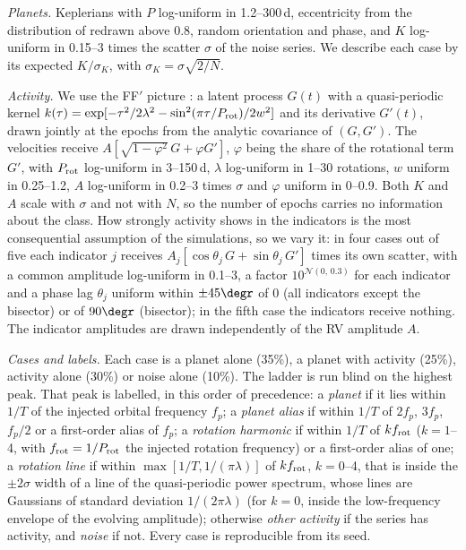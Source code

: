 \emph{Planets.} Keplerians with $P$ log-uniform in 1.2--300\,d, eccentricity from
the distribution of \citet{Kipping2013} redrawn above 0.8, random orientation and
phase, and $K$ log-uniform in 0.15--3 times the scatter $\sigma$ of the noise series.
We describe each case by its expected $K/\sigma_K$, with
$\sigma_K = \sigma\sqrt{2/N}$.

\emph{Activity.} We use the FF$'$ picture \citep{Aigrain2012,Rajpaul2015}: a latent
process $G(t)$ with a quasi-periodic kernel
$k(\tau) = \exp[-\tau^2/2\lambda^2 - \sin^2(\pi\tau/P_{\rm rot})/2w^2]$ and its
derivative $G'(t)$, drawn jointly at the epochs from the analytic covariance of
$(G, G')$. The velocities receive $A[\sqrt{1-\varphi^2}\,G + \varphi G']$, $\varphi$ being
the share of the rotational term $G'$, with
$P_{\rm rot}$ log-uniform in 3--150\,d, $\lambda$ log-uniform in 1--30 rotations, $w$
uniform in 0.25--1.2, $A$ log-uniform in 0.2--3 times $\sigma$ and $\varphi$ uniform in 0--0.9. Both $K$ and $A$ scale with $\sigma$ and not with $N$, so
the number of epochs carries no information about the class. How strongly activity
shows in the indicators is the most consequential assumption of the simulations, so
we vary it: in four cases out of five each indicator $j$ receives
$A_j[\cos\theta_j\,G + \sin\theta_j\,G']$ times its own scatter, with a common amplitude
log-uniform in 0.1--3, a factor $10^{\mathcal{N}(0,\,0.3)}$ for each indicator and a
phase lag $\theta_j$ uniform within $\pm45\degr$ of $0$ (all indicators except the
bisector) or of $90\degr$ (bisector); in the fifth case the indicators receive nothing.
The indicator amplitudes are drawn independently of the RV amplitude $A$.

\emph{Cases and labels.} Each case is a planet alone (35\%), a planet with activity
(25\%), activity alone (30\%) or noise alone (10\%). The ladder is run blind on the
highest peak. That peak is labelled, in this order of precedence:
a \emph{planet} if it lies within $1/T$ of the injected orbital frequency $f_p$;
a \emph{planet alias} if within $1/T$ of $2f_p$, $3f_p$, $f_p/2$ or a first-order alias
of $f_p$; a \emph{rotation harmonic} if within $1/T$ of $k f_{\rm rot}$ ($k = 1$--4, with
$f_{\rm rot} = 1/P_{\rm rot}$ the injected rotation frequency) or a first-order alias of
one; a \emph{rotation line} if within
$\max[1/T, 1/(\pi\lambda)]$ of $k f_{\rm rot}$, $k = 0$--4, that is inside the
$\pm2\sigma$ width of a line of the quasi-periodic power spectrum, whose lines are
Gaussians of standard deviation $1/(2\pi\lambda)$ (for $k = 0$, inside the
low-frequency envelope of the evolving amplitude); otherwise \emph{other activity} if
the series has activity, and \emph{noise} if not. Every case is reproducible from its
seed.
